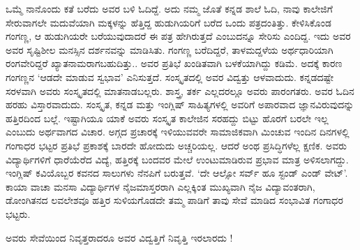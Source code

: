 {ಒಮ್ಮೆ ನಾನೊಂದು ಕತೆ ಬರೆದು ಅವರ ಬಳಿ ಓದಿದ್ದೆ. ಅದು ನಮ್ಮ ಜೊತೆ ಕನ್ನಡ ಶಾಲೆ ಓದಿ, ನಾವು ಕಾಲೇಜಿಗೆ ಸೇರುವಾಗಲೇ ಮದುವೆಯಾಗಿ ಮಕ್ಕಳನ್ನು ಹೆತ್ತಿದ್ದ ಹುಡುಗಿಯರಿಗೆ ಬರೆದ ಒಂದು ಪತ್ರದಂತಿತ್ತು. ಕೇಳಿಸಿಕೊಂಡ ಗಂಗಣ್ಣ, ಆ ಹುಡುಗಿಯರೇ  ಬರೆಯುವುದಾದರೆ ಈ ಪತ್ರ ಹೇಗಿರುತ್ತದೆ ಎಂಬುದನ್ನೂ ಸೇರಿಸು ಎಂದಿದ್ದ. ಇದು ಅವರ ಅವರ ಸೃಷ್ಟಿಶೀಲ ಮನಸ್ಸಿನ ದರ್ಶನವನ್ನು ಮಾಡಿಸಿತು. ಗಂಗಣ್ಣ ಬರೆದಿದ್ದರೆ, ತಾಳಮದ್ದಳೆಯ ಅರ್ಥಧಾರಿಯಾಗಿ ರಂಗವೇರಿದ್ದರೆ ಖ್ಯಾತನಾಮರಾಗಬಹುದಿತ್ತು.. ಅವರ ಪ್ರತಿಭೆ ಖಂಡಿತವಾಗಿ  ಬಳಕೆಯಾಗಿದ್ದು ಕಡಿಮೆ. ಅದಕ್ಕೆ ಕಾರಣ ಗಂಗಣ್ಣನ ‘ಆಡದೇ ಮಾಡುವ ಸ್ವಭಾವ’ ಎನಿಸುತ್ತದೆ. ಸಂಸ್ಕೃತದಲ್ಲಿ ಅವರ ವಿದ್ವತ್ತು ಆಳವಾದುದು. ಕನ್ನಡದಷ್ಟೇ ಸರಳವಾಗಿ ಅವರು ಸಂಸ್ಕೃತದಲ್ಲಿ ಮಾತನಾಡಬಲ್ಲರು. ಶಾಸ್ತ್ರ, ತರ್ಕ ಎಲ್ಲದರಲ್ಲೂ ಅವರು ಪಾರಂಗತರು. ಅವರ ಓದಿನ ಹರಹು ವಿಸ್ತಾರವಾದುದು. ಸಂಸ್ಕೃತ,  ಕನ್ನಡ ಮತ್ತು ಇಂಗ್ಲಿಷ್ ಸಾಹಿತ್ಯಗಳಲ್ಲಿ  ಅವರಿಗೆ ಅಪಾರವಾದ ಜ್ಞಾನವಿರುವುದನ್ನು ಹತ್ತಿರದಿಂದ ಬಲ್ಲೆ. ಇಷ್ಟಾಗಿಯೂ ಯಾಕೆ ಅವರು ಸಂಸ್ಕೃತ ಕಾಲೇಜಿನ ಸರಹದ್ದು ಬಿಟ್ಟು ಹೊರಗೆ ಬರಲೇ ಇಲ್ಲ ಎಂಬುದು ಅರ್ಥವಾಗದ ವಿಚಾರ. ಅಗ್ಗದ ಪ್ರಚಾರಕ್ಕೆ ಇಳಿಯುವವರೇ ಸಾಮಾಜಿಕವಾಗಿ ಮಿಂಚುವ ಇಂದಿನ ದಿನಗಳಲ್ಲಿ ಗಂಗಾಧರ ಭಟ್ಟರ ಪ್ರತಿಭೆ ಪ್ರಕಾಶಕ್ಕೆ ಬಾರದೇ ಹೋದುದು ಅಚ್ಚರಿಯಲ್ಲ. ಆದರೆ ಅಂಥ ಪ್ರಸಿದ್ಧಿಗಳೆಲ್ಲ ಕ್ಷಣಿಕ. ಅವರು ವಿದ್ಯಾರ್ಥಿಗಳಿಗೆ ಧಾರೆಯೆರೆದ ವಿದ್ಯೆ, ಹತ್ತಿರಕ್ಕೆ ಬಂದವರ ಮೇಲೆ ಉಂಟುಮಾಡಿರುವ ಪ್ರಭಾವ ಮಾತ್ರ ಅಳಿಸಲಾಗದ್ದು. ಇಂಗ್ಲಿಷ್ ಕವಿಯೊಬ್ಬರ ಕವನದ ಸಾಲುಗಳು ನೆನಪಿಗೆ ಬರುತ್ತವೆ. ‘ದೇ ಆಲ್ಸೋ ಸರ್ವ್ ಹೂ ಸ್ಟಂಡ್ ಎಂಡ್ ವೇಟ್’. ಕಾಯಾ ವಾಚಾ ಮನಸಾ ವಿದ್ಯಾರ್ಥಿಗಳ ನೈಜಮಾಸ್ತರರಾಗಿ ಎಲ್ಲಕ್ಕಿಂತ ಮುಖ್ಯವಾಗಿ ನೈಜ ವಿದ್ಯಾವಂತರಾಗಿ, ಡೋಂಗಿತನದ ಲವಲೇಶವೂ ಹತ್ತಿರ ಸುಳಿಯಗೊಡದೇ ತಮ್ಮ ಪಾಡಿಗೆ ತಾವು ಸೇವೆ ಮಾಡಿದ ಸಂಭಾವಿತ ಗಂಗಾಧರ ಭಟ್ಟರು. 

ಅವರು ಸೇವೆಯಿಂದ ನಿವೃತ್ತರಾದರೂ ಅವರ ವಿದ್ವತ್ತಿಗೆ  ನಿವೃತ್ತಿ ಇರಲಾರದು !

\articleend
}
